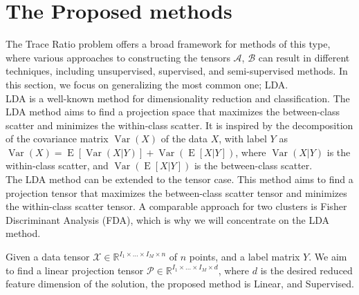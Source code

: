 \documentclass{siamltex}
\begin{document}
\section{The Proposed methods}\label{sec:proposed_methods}
The Trace Ratio problem offers a broad framework for methods of this type, where various approaches to constructing the tensors $\mathcal{A}$, $\mathcal{B}$ can result in different techniques, including unsupervised, supervised, and semi-supervised methods. In this section, we focus on generalizing the most common one; LDA.\\
LDA is a well-known method for dimensionality reduction and classification. The LDA method aims to find a projection space that maximizes the between-class scatter and minimizes the within-class scatter. It is inspired by the decomposition of the covariance matrix $\operatorname{Var}(X)$ of the data $X$, with label $Y$ as 
$\operatorname{Var}(X)= \operatorname{E}[\operatorname{Var}(X|Y)] + \operatorname{Var}(\operatorname{E}[X|Y])$, where $\operatorname{Var}(X|Y)$ is the within-class scatter, and $\operatorname{Var}(\operatorname{E}[X|Y])$ is the between-class scatter.\\
The LDA method can be extended to the tensor case. This method aims to find a projection tensor that maximizes the between-class scatter tensor and minimizes the within-class scatter tensor.
A comparable approach for two clusters is Fisher Discriminant Analysis (FDA), which is why we will concentrate on the LDA method.

Given a data tensor $\mathcal{X} \in \mathbb{R}^{I_1 \times \ldots \times I_M \times n}$ of $n$ points, and a label matrix $Y$. We aim to find a linear projection tensor $\mathcal{P} \in \mathbb{R}^{I_1 \times \ldots \times I_M \times d}$, where $d$ is the desired reduced feature dimension of the solution, the proposed method is Linear, and Supervised.
\end{document}
